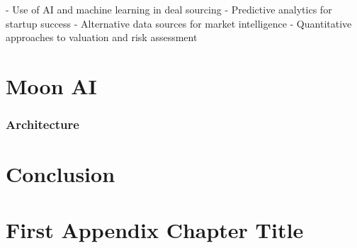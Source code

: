 \documentclass[a4paper, oneside]{discothesis}
\begin{document}
- Use of AI and machine learning in deal sourcing
- Predictive analytics for startup success
- Alternative data sources for market intelligence
- Quantitative approaches to valuation and risk assessment


\chapter{Moon AI}
\subsection{Architecture}

\chapter{Conclusion}





\appendix
\chapter{First Appendix Chapter Title}
\end{document}
